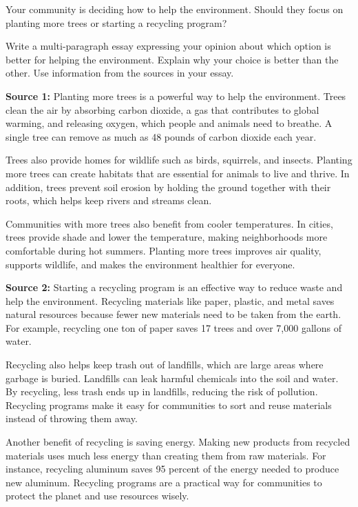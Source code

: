 \documentclass[12pt]{article}
\begin{document}
\begin{tcolorbox}[colframe=black!60, colback=white, 
coltitle=black, colbacktitle=black!15, fonttitle=\bfseries\Large, 
title=Independent Practice, halign title=center, left=10pt, right=10pt, top=10pt, bottom=15pt]
Your community is deciding how to help the environment. Should they focus on planting more trees or starting a recycling program?

Write a multi-paragraph essay expressing your opinion about which option is better for helping the environment. Explain why your choice is better than the other. Use information from the sources in your essay.

\vspace{1em}


\textbf{Source 1:} Planting more trees is a powerful way to help the environment. Trees clean the air by absorbing carbon dioxide, a gas that contributes to global warming, and releasing oxygen, which people and animals need to breathe. A single tree can remove as much as 48 pounds of carbon dioxide each year.

Trees also provide homes for wildlife such as birds, squirrels, and insects. Planting more trees can create habitats that are essential for animals to live and thrive. In addition, trees prevent soil erosion by holding the ground together with their roots, which helps keep rivers and streams clean.

Communities with more trees also benefit from cooler temperatures. In cities, trees provide shade and lower the temperature, making neighborhoods more comfortable during hot summers. Planting more trees improves air quality, supports wildlife, and makes the environment healthier for everyone.


\vspace{1em}

\textbf{Source 2:} Starting a recycling program is an effective way to reduce waste and help the environment. Recycling materials like paper, plastic, and metal saves natural resources because fewer new materials need to be taken from the earth. For example, recycling one ton of paper saves 17 trees and over 7,000 gallons of water.

Recycling also helps keep trash out of landfills, which are large areas where garbage is buried. Landfills can leak harmful chemicals into the soil and water. By recycling, less trash ends up in landfills, reducing the risk of pollution. Recycling programs make it easy for communities to sort and reuse materials instead of throwing them away.

Another benefit of recycling is saving energy. Making new products from recycled materials uses much less energy than creating them from raw materials. For instance, recycling aluminum saves 95 percent of the energy needed to produce new aluminum. Recycling programs are a practical way for communities to protect the planet and use resources wisely.


\end{tcolorbox}
\end{document}
